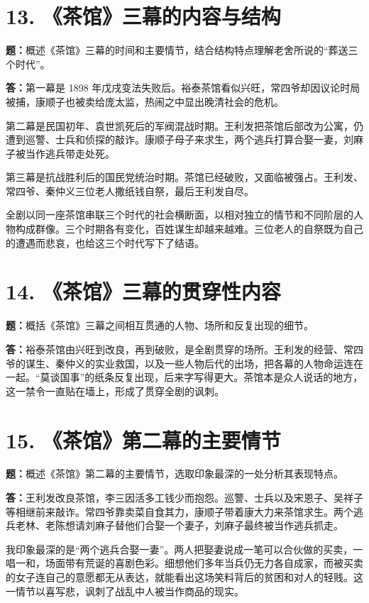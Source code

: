 \documentclass[11pt,a4paper,fontset=windows]{ctexart}
\newenvironment{answer}{\par\begingroup\answerlatin\answercjk}{\par\endgroup}
\begin{document}
\section*{13. 《茶馆》三幕的内容与结构}

\textbf{题：}概述《茶馆》三幕的时间和主要情节，结合结构特点理解老舍所说的“葬送三个时代”。

\begin{answer}
\textbf{答：}第一幕是 1898 年戊戌变法失败后。裕泰茶馆看似兴旺，常四爷却因议论时局被捕，康顺子也被卖给庞太监，热闹之中显出晚清社会的危机。

第二幕是民国初年、袁世凯死后的军阀混战时期。王利发把茶馆后部改为公寓，仍遭到巡警、士兵和侦探的敲诈。康顺子母子来求生，两个逃兵打算合娶一妻，刘麻子被当作逃兵带走处死。

第三幕是抗战胜利后的国民党统治时期。茶馆已经破败，又面临被强占。王利发、常四爷、秦仲义三位老人撒纸钱自祭，最后王利发自尽。

全剧以同一座茶馆串联三个时代的社会横断面，以相对独立的情节和不同阶层的人物构成群像。三个时期各有变化，百姓谋生却越来越难。三位老人的自祭既为自己的遭遇而悲哀，也给这三个时代写下了结语。

\end{answer}
\section*{14. 《茶馆》三幕的贯穿性内容}

\textbf{题：}概括《茶馆》三幕之间相互贯通的人物、场所和反复出现的细节。

\begin{answer}
\textbf{答：}裕泰茶馆由兴旺到改良，再到破败，是全剧贯穿的场所。王利发的经营、常四爷的谋生、秦仲义的实业救国，以及一些人物后代的出场，把各幕的人物命运连在一起。“莫谈国事”的纸条反复出现，后来字写得更大。茶馆本是众人说话的地方，这一禁令一直贴在墙上，形成了贯穿全剧的讽刺。

\end{answer}
\section*{15. 《茶馆》第二幕的主要情节}

\textbf{题：}概述《茶馆》第二幕的主要情节，选取印象最深的一处分析其表现特点。

\begin{answer}
\textbf{答：}王利发改良茶馆，李三因活多工钱少而抱怨。巡警、士兵以及宋恩子、吴祥子等相继前来敲诈。常四爷靠卖菜自食其力，康顺子带着康大力来茶馆求生。两个逃兵老林、老陈想请刘麻子替他们合娶一个妻子，刘麻子最终被当作逃兵抓走。

我印象最深的是“两个逃兵合娶一妻”。两人把娶妻说成一笔可以合伙做的买卖，一唱一和，场面带有荒诞的喜剧色彩。细想他们多年当兵仍无力各自成家，而被买卖的女子连自己的意愿都无从表达，就能看出这场笑料背后的贫困和对人的轻贱。这一情节以喜写悲，讽刺了战乱中人被当作商品的现实。
\end{answer}
\end{document}
